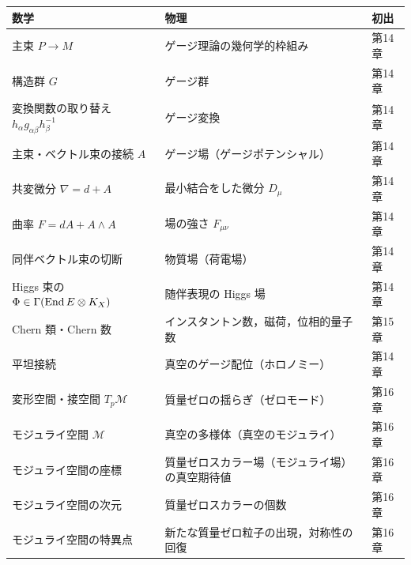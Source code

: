 \begin{center}
\small
\begin{tabular}{p{}p{}p{}}
\textbf{数学} & \textbf{物理} & \textbf{初出}\\ \hline
主束 $P\to M$ & ゲージ理論の幾何学的枠組み & 第14章\\
構造群 $G$ & ゲージ群 & 第14章\\
変換関数の取り替え $h_\alpha g_{\alpha\beta}h_\beta^{-1}$ & ゲージ変換 & 第14章\\
主束・ベクトル束の接続 $A$ & ゲージ場（ゲージポテンシャル） & 第14章\\
共変微分 $\nabla=d+A$ & 最小結合をした微分 $D_\mu$ & 第14章\\
曲率 $F=dA+A\wedge A$ & 場の強さ $F_{\mu\nu}$ & 第14章\\
同伴ベクトル束の切断 & 物質場（荷電場） & 第14章\\
Higgs 束の $\Phi\in\Gamma(\operatorname{End} E\otimes K_X)$ & 随伴表現の Higgs 場 & 第14章\\
Chern 類・Chern 数 & インスタントン数，磁荷，位相的量子数 & 第15章\\
平坦接続 & 真空のゲージ配位（ホロノミー） & 第14章\\
変形空間・接空間 $T_p\mathcal M$ & 質量ゼロの揺らぎ（ゼロモード） & 第16章\\
モジュライ空間 $\mathcal M$ & 真空の多様体（真空のモジュライ） & 第16章\\
モジュライ空間の座標 & 質量ゼロスカラー場（モジュライ場）の真空期待値 & 第16章\\
モジュライ空間の次元 & 質量ゼロスカラーの個数 & 第16章\\
モジュライ空間の特異点 & 新たな質量ゼロ粒子の出現，対称性の回復 & 第16章\\
\end{tabular}
\end{center}

